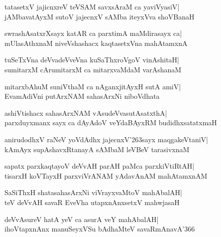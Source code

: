 \documentclass[twoside,12pt,openright]{book}
\def\S{\char'263}
\newcounter{shloka}[chapter]
\begin{document}
\begin{shloka}%
tatasetxV jajicnxreV teVSAM savxsAraM ca yaviVyasiV|\\
jAMbavatAyxM sutoV jajecnxV sAMba iteyxVva shoVBanaH
\end{shloka}

\begin{shloka}%
swrashAsatxrXsayx katAR ca parxtimA maMdirasayx ca|\\
mUlasAthxnaM niveVshashacx kaqtasetxVna mahAtamxnA
\end{shloka}

\begin{shloka}%
tuSeTxVna deVvadeVveVna kuSaThxroVgoV vinAshitaH|\\
sumitarxM cArumitarxM ca mitarxvaMdaM varAshanaM
\end{shloka}

\begin{shloka}%
mitarxbAhuM suniVthaM ca nAganxjitAyxH sutA amiV|\\
EvamAdiVni putArxNAM sahasArxNi niboVdhata
\end{shloka}

\begin{shloka}%
ashiVtishacx sahasArxNAM vAsudeVvasutAsatxthA|\\
parxduyxmanx sayx ca dAyAdoV veYdaBAyxRM budidhxsatatxmaH
\end{shloka}

\begin{shloka}%
anirudodhxV raNeV yoVdAdhx jajecnxV\S sayx maqgakeVtaniV|\\
kAmAyx supAshavxRtanayA sAMbaM leVBeV tarasivxnaM 
\end{shloka}

\begin{shloka}%
sapatx parxkaqtayoV deVvAH parAH paMca parxkiVtiRtAH|\\
tisarxH koVTayxH parxviVrANAM yAdavAnAM mahAtamxnAM
\end{shloka}

\begin{shloka}%
SaSiThxH shatasahasArxNi viVrayxvaMtoV mahAbalAH|\\
teV deVvAH savaR EveVha utapxnAnxsetxV mahwjasaH
\end{shloka}

\begin{shloka}%
deVvAsureV hatA yeV ca asurA veY mahAbalAH|\\
ihoVtapxnAnx manuSeyxVSu bAdhaMteV savaRmAnavA\char'366
\end{shloka}
\end{document}
